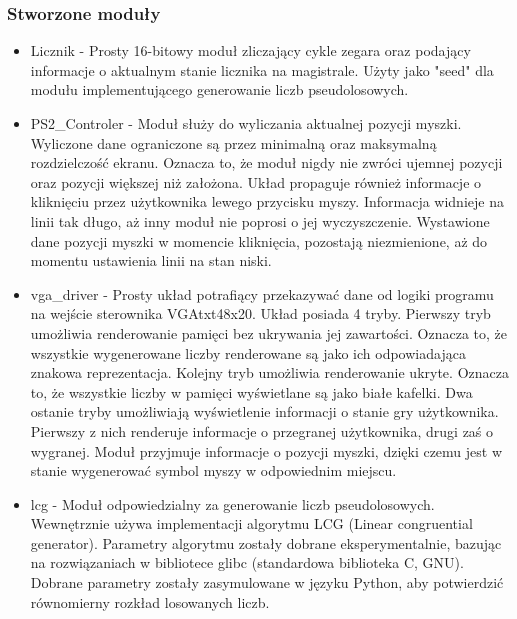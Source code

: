 \documentclass[polish,polish,a4paper]{article}
\begin{document}
\subsubsection{Stworzone moduły}
\begin{itemize}
 \item
  Licznik - Prosty 16-bitowy moduł zliczający cykle zegara oraz podający informacje o aktualnym stanie licznika na magistrale.
  Użyty jako "seed" dla modułu implementującego generowanie liczb pseudolosowych.

 \item
  PS2\_Controler - Moduł służy do wyliczania aktualnej pozycji myszki.
  Wyliczone dane ograniczone są przez minimalną oraz maksymalną rozdzielczość ekranu.
  Oznacza to, że moduł nigdy nie zwróci ujemnej pozycji oraz pozycji większej niż założona.
  Układ propaguje również informacje o kliknięciu przez użytkownika lewego przycisku myszy.
  Informacja widnieje na linii tak długo, aż inny moduł nie poprosi o jej wyczyszczenie.
  Wystawione dane pozycji myszki w momencie kliknięcia, pozostają niezmienione, aż do momentu ustawienia linii na stan niski. 

 \item
  vga\_driver - Prosty układ potrafiący przekazywać dane od logiki programu na wejście sterownika VGAtxt48x20.
  Układ posiada 4 tryby.
  Pierwszy tryb umożliwia renderowanie pamięci bez ukrywania jej zawartości.
  Oznacza to, że wszystkie wygenerowane liczby renderowane są jako ich odpowiadająca znakowa reprezentacja.
  Kolejny tryb umożliwia renderowanie ukryte.
  Oznacza to, że wszystkie liczby w pamięci wyświetlane są jako białe kafelki.
  Dwa ostanie tryby umożliwiają wyświetlenie informacji o stanie gry użytkownika.
  Pierwszy z nich renderuje informacje o przegranej użytkownika, drugi zaś o wygranej.
  Moduł przyjmuje informacje o pozycji myszki, dzięki czemu jest w stanie wygenerować symbol myszy w odpowiednim miejscu.

 \item
  lcg - Moduł odpowiedzialny za generowanie liczb pseudolosowych.
  Wewnętrznie używa implementacji algorytmu LCG (Linear congruential generator).
  Parametry algorytmu zostały dobrane eksperymentalnie, bazując na rozwiązaniach w bibliotece glibc (standardowa biblioteka C, GNU).
  Dobrane parametry zostały zasymulowane w języku Python, aby potwierdzić równomierny rozkład losowanych liczb.


\end{itemize}
\end{document}
